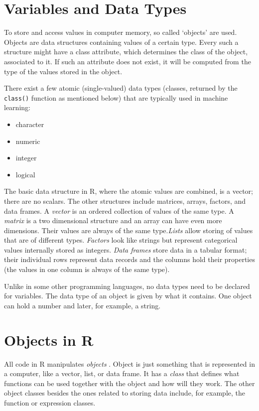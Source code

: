 \section{Variables and Data Types}

To store and access values in computer memory, so called ‘objects’ are used. Objects are data structures containing values of a certain type. Every such a structure
might have a class attribute, which determines the class of the object, associated
to it. If such an attribute does not exist, it will be computed from the type of the
values stored in the object.

There exist a few atomic (single-valued) data types (classes, returned by the
\texttt{class()} function as mentioned below) that are typically used in machine learning:

\begin{itemize}
    \item character
    \item numeric
    \item integer
    \item logical
\end{itemize}

The basic data structure in R, where the atomic values are combined, is a
vector; there are no scalars. The other structures include matrices, arrays, factors, and data frames. A \textit{vector} is an ordered collection of values of the same
type. A \textit{matrix} is a two dimensional structure and an array can have even more
dimensions. Their values are always of the same type.\textit{Lists} allow storing of values that are of different types. \textit{Factors} look like strings but represent categorical
values internally stored as integers. \textit{Data frames} store data in a tabular format;
their individual rows represent data records and the columns hold their properties
(the values in one column is always of the same type).

Unlike in some other programming languages, no data types need to be declared for variables. The data type of an object is given by what it contains. One
object can hold a number and later, for example, a string.

\section{Objects in R}

All code in R manipulates \textit{objects} \cite{ref4} . Object is just something that is represented
in a computer, like a vector, list, or data frame. It has a \textit{class} that defines what
functions can be used together with the object and how will they work. The other
object classes besides the ones related to storing data include, for example, the
function or expression classes.

